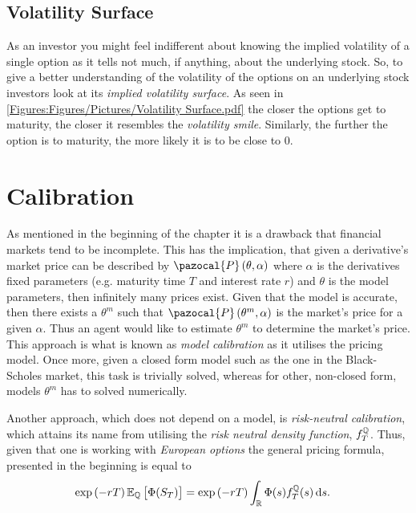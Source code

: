 \subsection{Volatility Surface}\label{SSec.Volatility_Surface}
As an investor you might feel indifferent about knowing the implied volatility of a single option as it tells not much, if anything, about the underlying stock. So, to give a better understanding of the volatility of the options on an underlying stock investors look at its \emph{implied volatility surface}. 
As seen in \autoref{Figures:Figures/Pictures/Volatility Surface.pdf} the closer the options get to maturity, the closer it resembles the \emph{volatility smile}. Similarly, the further the option is to maturity, the more likely it is to be close to 0. 


\section{Calibration}\label{Sec.Calibration}
As mentioned in the beginning of the chapter it is a drawback that financial markets tend to be incomplete. This has the implication, that given a derivative's market price can be described by $\pazocal{P}\left(\theta,\alpha\right)$ where $\alpha$ is the derivatives fixed parameters (e.g. maturity time $T$ and interest rate $r$) and $\theta$ is the model parameters, then infinitely many prices exist. Given that the model is accurate, then there exists a $\theta^m$ such that $\pazocal{P}\left(\theta^m,\alpha\right)$ is the market's price for a given $\alpha$. Thus an agent would like to estimate $\theta^m$ to determine the market's price. This approach is what is known as \emph{model calibration} as it utilises the pricing model. Once more, given a closed form model such as the one in the Black-Scholes market, this task is trivially solved, whereas for other, non-closed form, models $\theta^m$ has to solved numerically. 

Another approach, which does not depend on a model, is \emph{risk-neutral calibration}, which attains its name from utilising the \emph{risk neutral density function}, $f_T^{\mathbb{Q}}$. Thus, given that one is working with \emph{European options} the general pricing formula, presented in the beginning is equal to
\begin{align}\label{Eq:RND_Pricing}
    \exp\left(-rT\right)\E[\Q]{\Phi(S_T)} &= \exp\left(-rT\right)\int_\R\Phi(s)f_T^\Q(s)\,\mathrm{d}s.
\end{align}

